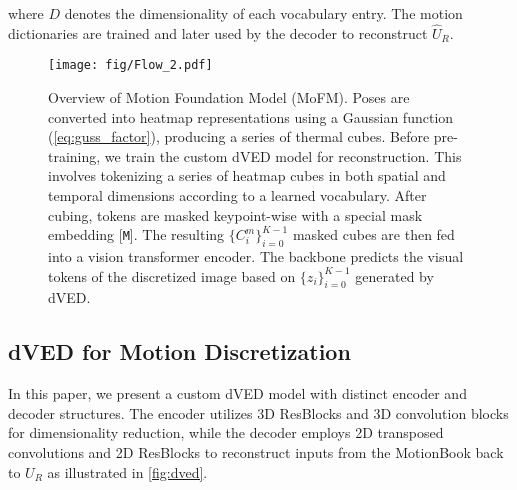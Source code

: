 where \( D \) denotes the dimensionality of each vocabulary entry. The motion dictionaries are trained and later used by the decoder to reconstruct \(\widehat{U}_R\). 
\begin{figure*}[h]
  \centering
  \texttt{[image: fig/Flow\_2.pdf]}
  \caption{Overview of Motion Foundation Model (MoFM). Poses are converted into heatmap representations using a Gaussian function (\cref{eq:guss_factor}), producing a series of thermal cubes. Before pre-training, we train the custom dVED model for reconstruction. This involves tokenizing a series of heatmap cubes in both spatial and temporal dimensions according to a learned vocabulary. After cubing, tokens are masked keypoint-wise with a special mask embedding [\texttt{M}]. The resulting \(\{C_i^{m}\}_{i=0}^{K-1}\) masked cubes are then fed into a vision transformer encoder. The backbone predicts the visual tokens of the discretized image based on \(\{z_i\}_{i=0}^{K-1}\) generated by dVED.}
  \label{fig:self_trans}
\end{figure*}
\subsection{dVED for Motion Discretization}
In this paper, we present a custom dVED model with distinct encoder and decoder structures. The encoder utilizes 3D ResBlocks and 3D convolution blocks for dimensionality reduction, while the decoder employs 2D transposed convolutions and 2D ResBlocks to reconstruct inputs from the MotionBook back to \(U_R\) as illustrated in \cref{fig:dved}. 



